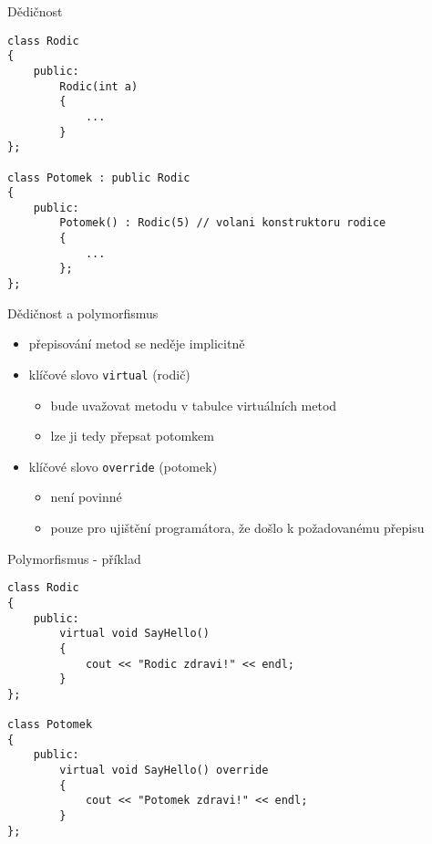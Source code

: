 \documentclass{beamer}
\begin{document}
\begin{xframe}{Dědičnost}
\begin{lstlisting}[basicstyle=\fontsize{9}{10}\selectfont\ttfamily]
class Rodic
{
    public:
        Rodic(int a)
        {
            ...
        }
};

class Potomek : public Rodic
{
    public:
        Potomek() : Rodic(5) // volani konstruktoru rodice
        {
            ...
        };
};
\end{lstlisting}
\end{xframe}

\begin{xframe}{Dědičnost a polymorfismus}
	\begin{itemize}
		\item přepisování metod se neděje implicitně
		\item klíčové slovo \texttt{virtual} (rodič)
			\begin{itemize}
				\item bude uvažovat metodu v tabulce virtuálních metod
				\item lze ji tedy přepsat potomkem
			\end{itemize}
		\item klíčové slovo \texttt{override} (potomek)
			\begin{itemize}
				\item není povinné
				\item pouze pro ujištění programátora, že došlo k požadovanému přepisu
			\end{itemize}
	\end{itemize}
\end{xframe}

\begin{xframe}{Polymorfismus - příklad}
\begin{lstlisting}[basicstyle=\fontsize{9}{10}\selectfont\ttfamily]
class Rodic
{
    public:
        virtual void SayHello()
        {
            cout << "Rodic zdravi!" << endl;
        }
};

class Potomek
{
    public:
        virtual void SayHello() override
        {
            cout << "Potomek zdravi!" << endl;
        }
};
\end{lstlisting}
\end{xframe}
\end{document}
